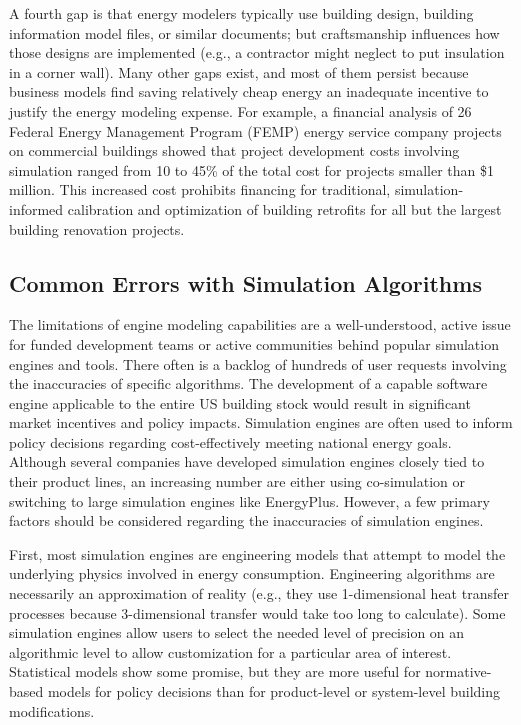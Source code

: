 \documentclass[preprint, review, 12pt]{elsarticle}
\begin{document}
A fourth gap is that energy modelers typically use building design, building information model files, or similar documents; but craftsmanship influences how those designs are implemented (e.g., a contractor might neglect to put insulation in a corner wall). Many other gaps exist, and most of them persist because business models find saving relatively cheap energy an inadequate incentive to justify the energy modeling expense. For example, a financial analysis of 26 Federal Energy Management Program (FEMP) energy service company projects on commercial buildings showed that project development costs involving simulation ranged from 10 to 45\% of the total cost for projects smaller than \$1 million. This increased cost %
prohibits financing for traditional, simulation-informed calibration and optimization of building retrofits for all but the largest building renovation projects.

\subsection{Common Errors with Simulation Algorithms}
The limitations of engine modeling capabilities are a well-understood, active issue for funded development teams or active communities behind popular simulation engines and tools. There often is a backlog of hundreds of user requests involving the inaccuracies of specific algorithms. The development of a capable software engine applicable to the entire US building stock would result in significant market incentives and policy impacts. Simulation engines are often used to inform policy decisions regarding cost-effectively meeting national energy goals. Although several companies have developed simulation engines closely tied to their product lines, an increasing number are either using co-simulation or switching to large simulation engines like EnergyPlus. However, a few primary factors should be considered regarding the inaccuracies of simulation engines.

First, most simulation engines are engineering models that attempt to model the underlying physics involved in energy consumption. Engineering algorithms are necessarily an approximation of reality (e.g., they use 1-dimensional heat transfer processes because 3-dimensional transfer would take too long to calculate). Some simulation engines allow users to select the needed level of precision on an algorithmic level to allow customization for a particular area of interest. Statistical models show some promise, but they are more useful for normative-based models for policy decisions than for product-level or system-level building modifications. 
\end{document}
